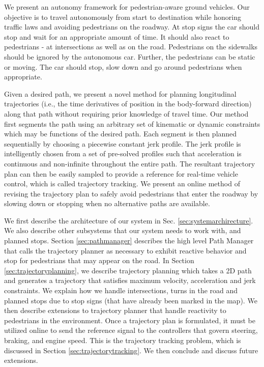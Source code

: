 \documentclass[letterpaper, 10 pt, conference]{ieeeconf}  %
\begin{document}
We present an autonomy framework for pedestrian-aware ground vehicles.
Our objective is to travel autonomously from start to destination while honoring traffic laws and avoiding pedestrians on the roadway.
At stop signs the car should stop and wait for an appropriate amount of time.
It should also react to pedestrians - at intersections as well as on the road.
Pedestrians on the sidewalks should be ignored by the autonomous car.
Further, the pedestrians can be static or moving.
The car should stop, slow down and go around pedestrians when appropriate.

Given a desired path, we present a novel method for planning longitudinal trajectories (i.e., the time derivatives of position in the body-forward direction) along that path without requiring prior knowledge of travel time.
Our method first segments the path using an arbitrary set of kinematic or dynamic constraints which may be functions of the desired path.
Each segment is then planned sequentially by choosing a piecewise constant jerk profile.
The jerk profile is intelligently chosen from a set of pre-solved profiles such that acceleration is continuous and non-infinite throughout the entire path.
The resultant trajectory plan can then be easily sampled to provide a reference for real-time vehicle control, which is called trajectory tracking.
We present an online method of revising the trajectory plan to safely avoid pedestrians that enter the roadway by slowing down or stopping when no alternative paths are available.

We first describe the architecture of our system in Sec. \ref{sec:systemarchirecture}.
We also describe other subsystems that our system needs to work with, and planned stops.
Section \ref{sec:pathmanager} describes the high level Path Manager that calls the trajectory planner as necessary to 
exhibit reactive behavior and stop for pedestrians that may appear on the road.
In Section \ref{sec:trajectoryplanning}, we describe trajectory planning which takes a 2D path and generates a trajectory that satisfies maximum velocity, acceleration and jerk constraints. 
We explain how we handle intersections, turns in the road and planned stops due to stop signs (that have already been marked in the map).
We then describe extensions to trajectory planner that handle reactivity to pedestrians in the environment. 
Once a trajectory plan is formulated, it must be utilized online to send the reference signal to the controllers that govern steering, braking, and engine speed.
This is the trajectory tracking problem, which is discussed in Section \ref{sec:trajectorytracking}.
We then conclude and discuss future extensions.
\end{document}
